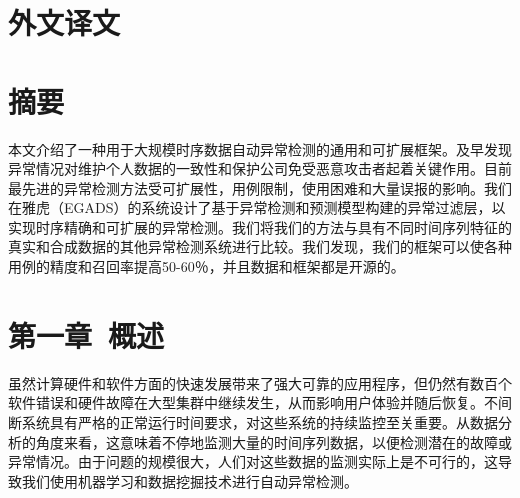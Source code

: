 \documentclass[a4paper,AutoFakeBold,oneside,12pt]{book}
\begin{document}
\newpage\backmatter
\chapter*{外\quad{}文\quad{}译\quad{}文}
\vspace{8mm}

\thispagestyle{empty}

\begin{center}
\sihao{}

\xiaosihao{}

\xiaosihao{}
\end{center}

\songti{}
\let\clearpage\relax


\chapter*{摘要}
本文介绍了一种用于大规模时序数据自动异常检测的通用和可扩展框架。及早发现异常情况对维护个人数据的一致性和保护公司免受恶意攻击者起着关键作用。目前最先进的异常检测方法受可扩展性，用例限制，使用困难和大量误报的影响。我们在雅虎（EGADS）的系统设计了基于异常检测和预测模型构建的异常过滤层，以实现时序精确和可扩展的异常检测。我们将我们的方法与具有不同时间序列特征的真实和合成数据的其他异常检测系统进行比较。我们发现，我们的框架可以使各种用例的精度和召回率提高50-60％，并且数据和框架都是开源的。


\chapter*{第一章\ 概述}
虽然计算硬件和软件方面的快速发展带来了强大可靠的应用程序，但仍然有数百个软件错误和硬件故障在大型集群中继续发生，从而影响用户体验并随后恢复。不间断系统具有严格的正常运行时间要求，对这些系统的持续监控至关重要。从数据分析的角度来看，这意味着不停地监测大量的时间序列数据，以便检测潜在的故障或异常情况。由于问题的规模很大，人们对这些数据的监测实际上是不可行的，这导致我们使用机器学习和数据挖掘技术进行自动异常检测。
\end{document}
